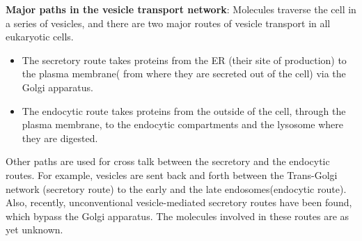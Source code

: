 \textbf{Major paths in the vesicle transport network}:
Molecules traverse the cell in a series of vesicles, and there are two major routes of vesicle transport in all eukaryotic cells.
%
\begin{itemize}
	\item The secretory route takes proteins from the ER (their site of production) to the plasma membrane( from where they are secreted out of the cell) via the Golgi apparatus\cite{alberts2002molecular}.
	\item The endocytic route takes proteins from the outside of the cell, through the plasma membrane, to the endocytic compartments and the lysosome where they are digested. 
\end{itemize}
Other paths are used for cross talk between the secretory and the endocytic routes. For example, vesicles are sent back and forth between the Trans-Golgi network (secretory route) to the early and the late endosomes(endocytic route)\cite{progida2016bidirectional}. Also, recently, unconventional vesicle-mediated secretory routes have been found, which bypass the Golgi apparatus. The molecules involved in these routes are as yet unknown\cite{nickel2018unconventional}. 


%


